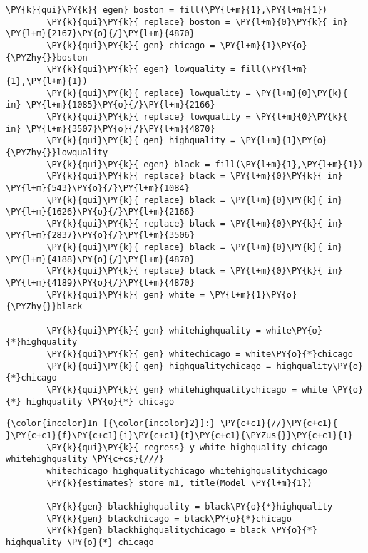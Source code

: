 \documentclass[11pt,notitlepage]{article}\usepackage[]{graphicx}\usepackage[]{color}
\makeatletter
\newenvironment{kframe}{%
 \def\at@end@of@kframe{}%
 \ifinner\ifhmode%
  \def\at@end@of@kframe{\end{minipage}}%
  \begin{minipage}{\columnwidth}%
 \fi\fi%
 \def\FrameCommand##1{\hskip\@totalleftmargin \hskip-\fboxsep
 \colorbox{shadecolor}{##1}\hskip-\fboxsep
     \hskip-\linewidth \hskip-\@totalleftmargin \hskip\columnwidth}%
 \MakeFramed {\advance\hsize-\width
   \@totalleftmargin\z@ \linewidth\hsize
   \@setminipage}}%
 {\par\unskip\endMakeFramed%
 \at@end@of@kframe}
\newenvironment{knitrout}{}{} %
\makeatother
\begin{document}
\begin{enumerate}[a)]
\begin{knitrout}
\begin{kframe}
\begin{Verbatim}[commandchars=\\\{\}]
        \PY{k}{qui}\PY{k}{ egen} boston = fill(\PY{l+m}{1},\PY{l+m}{1})
        \PY{k}{qui}\PY{k}{ replace} boston = \PY{l+m}{0}\PY{k}{ in} \PY{l+m}{2167}\PY{o}{/}\PY{l+m}{4870}
        \PY{k}{qui}\PY{k}{ gen} chicago = \PY{l+m}{1}\PY{o}{\PYZhy{}}boston
        \PY{k}{qui}\PY{k}{ egen} lowquality = fill(\PY{l+m}{1},\PY{l+m}{1})
        \PY{k}{qui}\PY{k}{ replace} lowquality = \PY{l+m}{0}\PY{k}{ in} \PY{l+m}{1085}\PY{o}{/}\PY{l+m}{2166}
        \PY{k}{qui}\PY{k}{ replace} lowquality = \PY{l+m}{0}\PY{k}{ in} \PY{l+m}{3507}\PY{o}{/}\PY{l+m}{4870}
        \PY{k}{qui}\PY{k}{ gen} highquality = \PY{l+m}{1}\PY{o}{\PYZhy{}}lowquality
        \PY{k}{qui}\PY{k}{ egen} black = fill(\PY{l+m}{1},\PY{l+m}{1})
        \PY{k}{qui}\PY{k}{ replace} black = \PY{l+m}{0}\PY{k}{ in} \PY{l+m}{543}\PY{o}{/}\PY{l+m}{1084}
        \PY{k}{qui}\PY{k}{ replace} black = \PY{l+m}{0}\PY{k}{ in} \PY{l+m}{1626}\PY{o}{/}\PY{l+m}{2166}
        \PY{k}{qui}\PY{k}{ replace} black = \PY{l+m}{0}\PY{k}{ in} \PY{l+m}{2837}\PY{o}{/}\PY{l+m}{3506}
        \PY{k}{qui}\PY{k}{ replace} black = \PY{l+m}{0}\PY{k}{ in} \PY{l+m}{4188}\PY{o}{/}\PY{l+m}{4870}
        \PY{k}{qui}\PY{k}{ replace} black = \PY{l+m}{0}\PY{k}{ in} \PY{l+m}{4189}\PY{o}{/}\PY{l+m}{4870}
        \PY{k}{qui}\PY{k}{ gen} white = \PY{l+m}{1}\PY{o}{\PYZhy{}}black
        
        \PY{k}{qui}\PY{k}{ gen} whitehighquality = white\PY{o}{*}highquality
        \PY{k}{qui}\PY{k}{ gen} whitechicago = white\PY{o}{*}chicago
        \PY{k}{qui}\PY{k}{ gen} highqualitychicago = highquality\PY{o}{*}chicago
        \PY{k}{qui}\PY{k}{ gen} whitehighqualitychicago = white \PY{o}{*} highquality \PY{o}{*} chicago
\end{Verbatim}

    \begin{Verbatim}[commandchars=\\\{\}]
{\color{incolor}In [{\color{incolor}2}]:} \PY{c+c1}{//}\PY{c+c1}{ }\PY{c+c1}{f}\PY{c+c1}{i}\PY{c+c1}{t}\PY{c+c1}{\PYZus{}}\PY{c+c1}{1}
        \PY{k}{qui}\PY{k}{ regress} y white highquality chicago whitehighquality \PY{c+cs}{///}
        whitechicago highqualitychicago whitehighqualitychicago
        \PY{k}{estimates} store m1, title(Model \PY{l+m}{1})
        
        \PY{k}{gen} blackhighquality = black\PY{o}{*}highquality
        \PY{k}{gen} blackchicago = black\PY{o}{*}chicago
        \PY{k}{gen} blackhighqualitychicago = black \PY{o}{*} highquality \PY{o}{*} chicago
\end{Verbatim}


\end{kframe}
\end{knitrout}
\end{enumerate}
\end{document}
